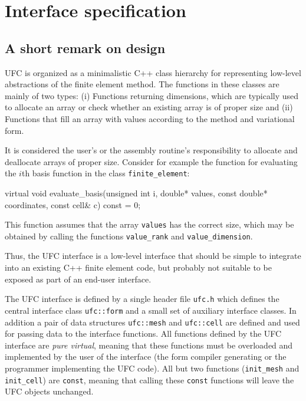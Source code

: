 \chapter{Interface specification}
\label{sec:interface}


\section{A short remark on design}

UFC is organized as a minimalistic C++ class hierarchy for
representing low-level abstractions of the finite element method. The
functions in these classes are mainly of two types: (i) Functions
returning dimensions, which are typically used to allocate an array or
check whether an existing array is of proper size and (ii) Functions
that fill an array with values according to the method and variational
form.

It is considered the user's or the assembly routine's
responsibility to allocate and deallocate arrays of proper size.
Consider for example the function for evaluating the $i$th basis
function in the class \texttt{finite\_element}:
\begin{code}
virtual void evaluate_basis(unsigned int i, double* values,
                            const double* coordinates,
                            const cell& c) const = 0;
\end{code}
This function assumes that the array \texttt{values} has the correct
size, which may be obtained by calling the functions
\texttt{value\_rank} and \texttt{value\_dimension}.

Thus, the UFC interface is a low-level interface that should be simple
to integrate into an existing C++ finite element code, but probably
not suitable to be exposed as part of an end-user interface.

The UFC interface is defined by a single header file \texttt{ufc.h}
which defines the central interface class \texttt{ufc::form} and a
small set of auxiliary interface classes. In addition a pair of data
structures \texttt{ufc::mesh} and \texttt{ufc::cell} are defined and
used for passing data to the interface functions. All functions
defined by the UFC interface are \emph{pure virtual}, meaning that
these functions must be overloaded and implemented by the user of the
interface (the form compiler generating or the programmer implementing
the UFC code). All but two functions (\texttt{init\_mesh} and
\texttt{init\_cell}) are \texttt{const}, meaning that calling these
\texttt{const} functions will leave the UFC objects unchanged.

